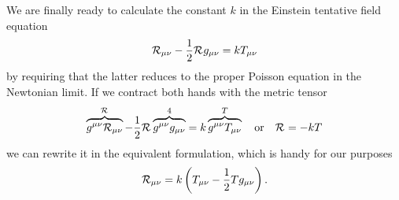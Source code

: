 We are finally ready to calculate the constant $k$ in the Einstein tentative field
equation
\begin{align*}
  \mathcal{R}_{\mu\nu} - \frac{1}{2}\mathcal{R}_{}g_{\mu\nu} = kT_{\mu\nu}
\end{align*}
by requiring that the latter reduces to the proper Poisson equation in the Newtonian
limit. If we contract both hands with the metric tensor
\begin{align*}
  \overbrace{g^{\mu\nu}\mathcal{R}_{\mu\nu}}^{\mathcal{R}_{}} -
  \frac{1}{2}\mathcal{R}_{} \overbrace{g^{\mu\nu}g_{\mu\nu}}^{4} = k \overbrace{g^{\mu\nu}T_{\mu\nu}}^{T}
  \quad \text{or}\quad \mathcal{R}_{} = -kT
\end{align*}
we can rewrite it in the equivalent formulation, which is handy for our purposes
\begin{align*}
  \mathcal{R}_{\mu\nu} = k\left( T_{\mu\nu} - \frac{1}{2}Tg_{\mu\nu} \right).
\end{align*}


